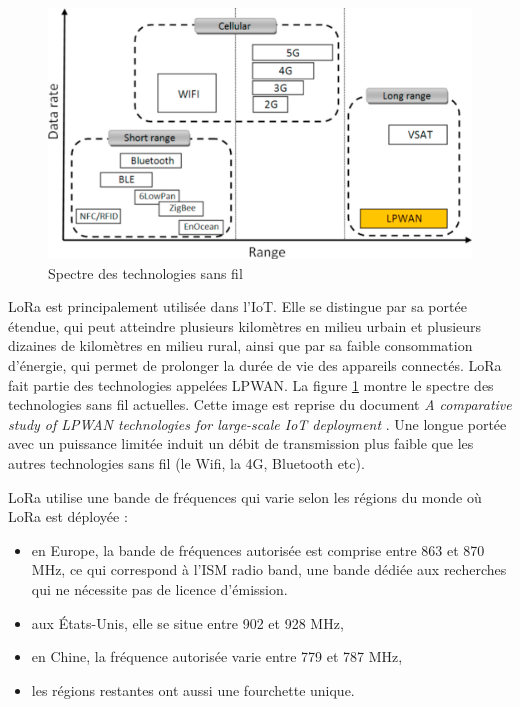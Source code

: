 \begin{figure}[h]
\centering

\includegraphics[scale=0.5]{images/lpwan.png}
\caption{Spectre des technologies sans fil}\label{term101}
\end{figure}


\ac{LoRa} est principalement utilisée dans l'\ac{IoT}. Elle se distingue par sa portée étendue, qui peut atteindre plusieurs kilomètres en milieu urbain et plusieurs dizaines de kilomètres en milieu rural, ainsi que par sa faible consommation d'énergie, qui permet de prolonger la durée de vie des appareils connectés. \ac{LoRa} fait partie des technologies appelées \ac{LPWAN}. La figure \ref{term101} montre le spectre des technologies sans fil actuelles. Cette image est reprise du document \textit{A comparative study of LPWAN technologies for large-scale IoT deployment} \cite{lpwan1}. Une longue portée avec un puissance limitée induit un débit de transmission plus faible que les autres technologies sans fil (le Wifi, la 4G, Bluetooth etc).

\vspace{0.1cm}

\ac{LoRa} utilise une bande de fréquences qui varie selon les régions du monde où LoRa est déployée :

\vspace{0.1cm}

\begin{itemize}
\item en Europe, la bande de fréquences autorisée est comprise entre 863 et 870 MHz, ce qui correspond à l'\ac{ISM} radio band, une bande dédiée aux recherches qui ne nécessite pas de licence d'émission.
\item aux États-Unis, elle se situe entre 902 et 928 MHz,
\item en Chine, la fréquence autorisée varie entre 779 et 787 MHz,
\item les régions restantes ont aussi une fourchette unique.
\end{itemize}

